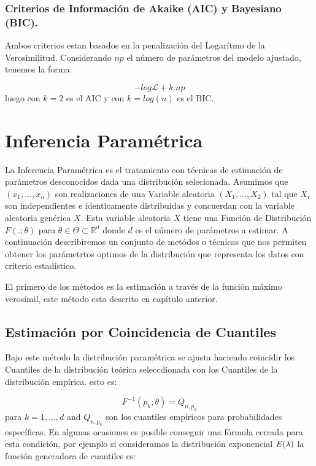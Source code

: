 \documentclass[]{article}
\begin{document}
\hypertarget{criterios-de-informacion-de-akaike-aic-y-bayesiano-bic.}{%
\subsubsection{Criterios de Información de Akaike (AIC) y Bayesiano
(BIC).}\label{criterios-de-informacion-de-akaike-aic-y-bayesiano-bic.}}

Ambos criterios estan basados en la penalización del Logarítmo de la
Verosimilitud. Considerando \(np\) el número de parámetros del modelo
ajustado, tenemos la forma:

\[-log\mathcal{L} + k.np\] luego con \(k=2\) es el AIC y con
\(k=log(n)\) es el BIC.

\hypertarget{inferencia-parametrica}{%
\section{Inferencia Paramétrica}\label{inferencia-parametrica}}

La Inferencia Paramétrica es el tratamiento con técnicas de estimación
de parámetros desconocidos dada una distribución selecionada. Asumimos
que \((x_1, ..., x_n)\) son realizaciones de una Variable aleatoria
\((X_1, ...,X_2)\) tal que \(X_i\) son independientes e identicamente
distribuidas y concuerdan con la variable aleatoria genérica \(X\). Esta
variable aleatoria \(X\) tiene una Función de Distribución
\(F(.;\theta)\) para \(\theta \in \Theta \subset \mathbb{R}^d\) donde
\(d\) es el número de parámetros a estimar. A continuación describiremos
un conjunto de metódos o técnicas que nos permiten obtener los
parámetrtos optimos de la distribución que representa los datos con
criterio estadístico.

El primero de los métodos es la estimación a través de la función máximo
verosímil, este método esta descrito en capítulo anterior.

\hypertarget{estimacion-por-coincidencia-de-cuantiles}{%
\subsection{Estimación por Coincidencia de
Cuantiles}\label{estimacion-por-coincidencia-de-cuantiles}}

Bajo este método la distribución paramétrica se ajusta haciendo
coincidir los Cuantiles de la distribución teórica seleccdionada con los
Cuantiles de la distribución empírica. esto es:

\[F^{-1}(p_k;\theta)=Q_{n,p_k}\] para \(k=1, ...,d\) and \(Q_{n,p_{k}}\)
son los cuantiles empíricos para probabilidades específicas. En algunas
ocasiones es posible conseguir una fórmula cerrada para esta condición,
por ejemplo si consideramos la distribución exponencial
\(\it{E}(\lambda)\) la función generadora de cuantiles es:
\end{document}
